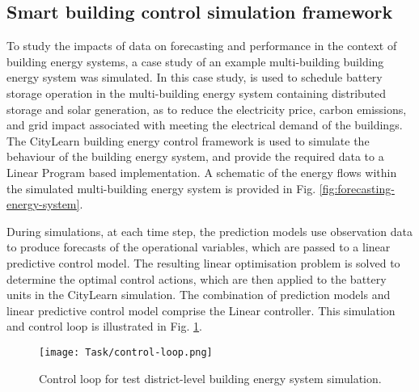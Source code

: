 \subsection{Smart building control simulation framework}


To study the impacts of data on forecasting and  performance in the context of building energy systems, a case study of an example multi-building building energy system was simulated. In this case study,  is used to schedule battery storage operation in the multi-building energy system containing distributed storage and solar generation, as to reduce the electricity price, carbon emissions, and grid impact associated with meeting the electrical demand of the buildings. The CityLearn \citep{vazquez-canteli2019CityLearnV1OpenAI,vazquez-canteli2020CityLearnStandardizingResearch} building energy control framework is used to simulate the behaviour of the building energy system, and provide the required data to a Linear Program based  implementation. A schematic of the energy flows within the simulated multi-building energy system is provided in Fig. \ref{fig:forecasting-energy-system}.

During simulations, at each time step, the prediction models use observation data to produce forecasts of the operational variables, which are passed to a linear predictive control model. The resulting linear optimisation problem is solved to determine the optimal control actions, which are then applied to the battery units in the CityLearn simulation. The combination of prediction models and linear predictive control model comprise the Linear  controller.
This simulation and control loop is illustrated in Fig. \ref{fig:forecasting-control-loop}.\\

\begin{figure}[h]
    \centering
    \texttt{[image: Task/control-loop.png]}
    \caption{Control loop for  test district-level building energy system simulation.}
    \label{fig:forecasting-control-loop}
\end{figure}

